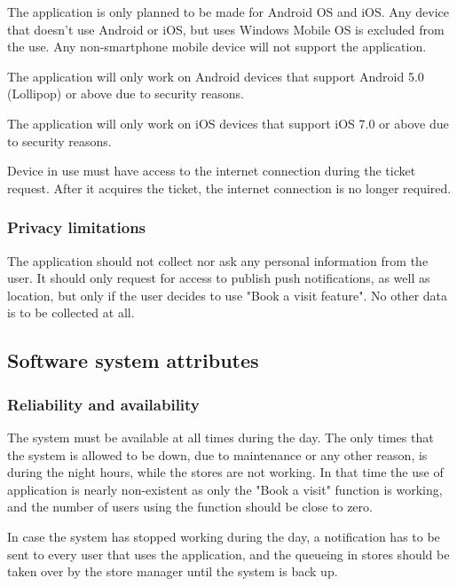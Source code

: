 \hspace{\parindent}The application is only planned to be made for Android OS and iOS. Any device that doesn't use Android or iOS, but uses Windows Mobile OS is excluded from the use. Any non-smartphone mobile device will not support the application.

The application will only work on Android devices that support Android 5.0 (Lollipop) or above due to security reasons. 

The application will only work on iOS devices that support iOS 7.0 or above due to security reasons.

Device in use must have access to the internet connection during the ticket request. After it acquires the ticket, the internet connection is no longer required.
\subsubsection{Privacy limitations}

\hspace{\parindent} The application should not collect nor ask any personal information from the user. It should only request for access to publish push notifications, as well as location, but only if the user decides to use "Book a visit feature". No other data is to be collected at all. 

\newpage

\subsection{Software system attributes}
\subsubsection{Reliability and availability}
\hspace{\parindent}The system must be available at all times during the day. The only times that the system is allowed to be down, due to maintenance or any other reason, is during the night hours, while the stores are not working. In that time the use of application is nearly non-existent as only the "Book a visit" function is working, and the number of users using the function should be close to zero.

In case the system has stopped working during the day, a notification has to be sent to every user that uses the application, and the queueing in stores should be taken over by the store manager until the system is back up.

